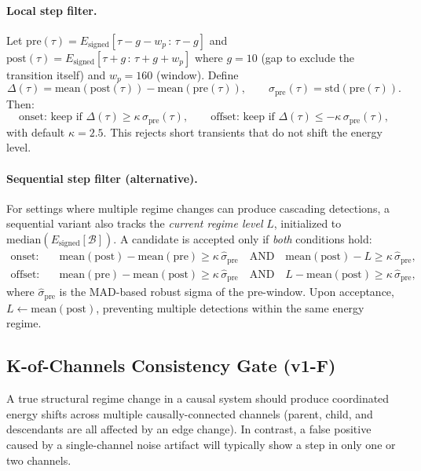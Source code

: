 \documentclass{article}
\begin{document}
\paragraph{Local step filter.}
Let $\mathrm{pre}(\tau) = E_{\mathrm{signed}}[\tau - g - w_p\,:\,\tau - g]$ and
$\mathrm{post}(\tau) = E_{\mathrm{signed}}[\tau + g\,:\,\tau + g + w_p]$
where $g = 10$ (gap to exclude the transition itself) and $w_p = 160$ (window). Define
\[
\Delta(\tau) = \mathrm{mean}(\mathrm{post}(\tau)) - \mathrm{mean}(\mathrm{pre}(\tau)),
\qquad
\sigma_{\mathrm{pre}}(\tau) = \mathrm{std}(\mathrm{pre}(\tau)).
\]
Then:
\[
\text{onset: keep if } \Delta(\tau) \ge \kappa\,\sigma_{\mathrm{pre}}(\tau),\qquad
\text{offset: keep if } \Delta(\tau) \le -\kappa\,\sigma_{\mathrm{pre}}(\tau),
\]
with default $\kappa = 2.5$. This rejects short transients that do not shift the energy level.

\paragraph{Sequential step filter (alternative).}
For settings where multiple regime changes can produce cascading detections, a sequential variant
also tracks the \emph{current regime level} $L$, initialized to $\mathrm{median}(E_{\mathrm{signed}}[\mathcal{B}])$.
A candidate is accepted only if \emph{both} conditions hold:
\begin{align*}
\text{onset:} &\quad \mathrm{mean}(\mathrm{post}) - \mathrm{mean}(\mathrm{pre}) \ge \kappa\,\hat{\sigma}_{\mathrm{pre}} \quad \text{AND} \quad \mathrm{mean}(\mathrm{post}) - L \ge \kappa\,\hat{\sigma}_{\mathrm{pre}}, \\
\text{offset:} &\quad \mathrm{mean}(\mathrm{pre}) - \mathrm{mean}(\mathrm{post}) \ge \kappa\,\hat{\sigma}_{\mathrm{pre}} \quad \text{AND} \quad L - \mathrm{mean}(\mathrm{post}) \ge \kappa\,\hat{\sigma}_{\mathrm{pre}},
\end{align*}
where $\hat{\sigma}_{\mathrm{pre}}$ is the MAD-based robust sigma of the pre-window.
Upon acceptance, $L \leftarrow \mathrm{mean}(\mathrm{post})$, preventing multiple detections
within the same energy regime.

\subsection{K-of-Channels Consistency Gate (v1-F)}
\label{sec:channel-gate}
A true structural regime change in a causal system should produce coordinated energy shifts across
multiple causally-connected channels (parent, child, and descendants are all affected by an edge
change). In contrast, a false positive caused by a single-channel noise artifact will typically
show a step in only one or two channels.
\end{document}
